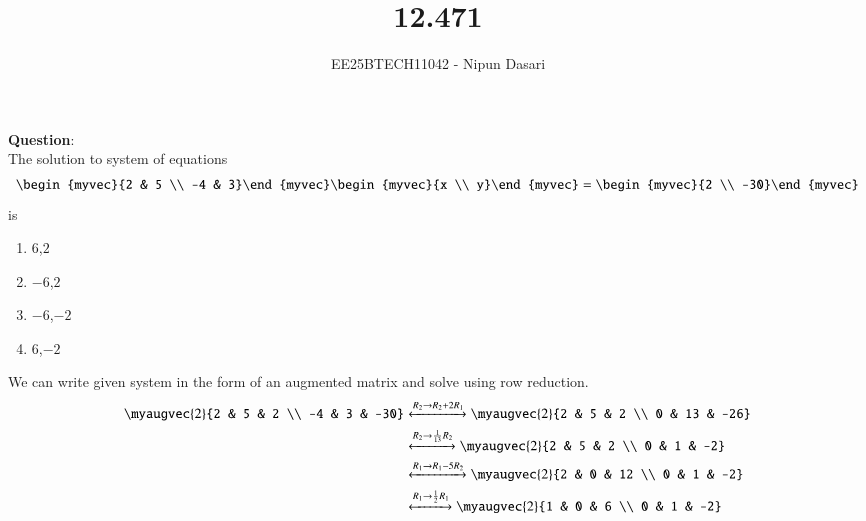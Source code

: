 \documentclass[journal]{IEEEtran}
\begin{document}
	
	
	\vspace{3cm}
	
	\title{12.471}
	\author{EE25BTECH11042 - Nipun Dasari}
	\maketitle
	
	\renewcommand{\thefigure}{\theenumi}
	\renewcommand{\thetable}{\theenumi}
	\setlength{\intextsep}{10pt} %
	
	
	\renewcommand{\thetable}{\theenumi}
	
	\textbf{Question}:\\
	The solution to system of equations
	\begin{align}
		\begin{myvec}{2 & 5 \\ -4 & 3}\end{myvec}
		\begin{myvec}{x \\ y}\end{myvec}
		=
		\begin{myvec}{2 \\ -30}\end{myvec}
	\end{align}
	is
	\begin{enumerate}
		\item $6$,$2$
		\item $-6$,$2$
		\item $-6$,$-2$
		\item $6$,$-2$
	\end{enumerate}
	\solution
	
	We can write given system in the form of an augmented matrix and solve using row reduction.
	\begin{align}
		\myaugvec{2}{2 & 5 & 2 \\ -4 & 3 & -30} &\xleftrightarrow{R_2 \to R_2 + 2R_1} \myaugvec{2}{2 & 5 & 2 \\ 0 & 13 & -26} \\
		&\xleftrightarrow{R_2 \to \frac{1}{13}R_2} \myaugvec{2}{2 & 5 & 2 \\ 0 & 1 & -2} \\
		&\xleftrightarrow{R_1 \to R_1 - 5R_2} \myaugvec{2}{2 & 0 & 12 \\ 0 & 1 & -2} \\
		&\xleftrightarrow{R_1 \to \frac{1}{2}R_1} \myaugvec{2}{1 & 0 & 6 \\ 0 & 1 & -2}
	\end{align}
	
\end{document}
